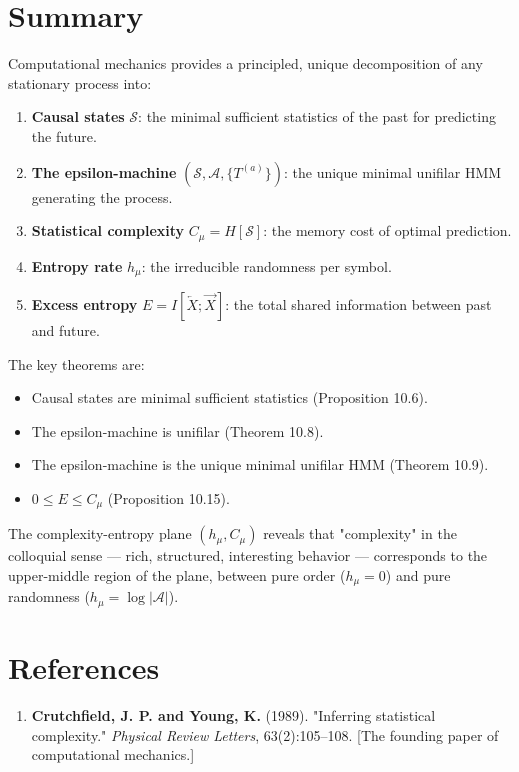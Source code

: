 \section{Summary}

Computational mechanics provides a principled, unique decomposition of any stationary process into:

\begin{enumerate}
\item \textbf{Causal states} $\mathcal{S}$: the minimal sufficient statistics of the past for predicting the future.
\item \textbf{The epsilon-machine} $(\mathcal{S}, \mathcal{A}, \{ T^{(a)}\} )$: the unique minimal unifilar HMM generating the process.
\item \textbf{Statistical complexity} $C_\mu = H[\mathcal{S}]$: the memory cost of optimal prediction.
\item \textbf{Entropy rate} $h_\mu$: the irreducible randomness per symbol.
\item \textbf{Excess entropy} $E = I[\overleftarrow{X}; \overrightarrow{X}]$: the total shared information between past and future.
\end{enumerate}

The key theorems are:
\begin{itemize}
\item Causal states are minimal sufficient statistics (Proposition 10.6).
\item The epsilon-machine is unifilar (Theorem 10.8).
\item The epsilon-machine is the unique minimal unifilar HMM (Theorem 10.9).
\item $0 \leq E \leq C_\mu$ (Proposition 10.15).
\end{itemize}

The complexity-entropy plane $(h_\mu, C_\mu)$ reveals that "complexity" in the colloquial sense --- rich, structured, interesting behavior --- corresponds to the upper-middle region of the plane, between pure order ($h_\mu = 0$) and pure randomness ($h_\mu = \log|\mathcal{A}|$).



\section{References}

\begin{enumerate}
\item \textbf{Crutchfield, J. P. and Young, K.} (1989). "Inferring statistical complexity." \textit{Physical Review Letters}, 63(2):105--108. [The founding paper of computational mechanics.]
\end{enumerate}

